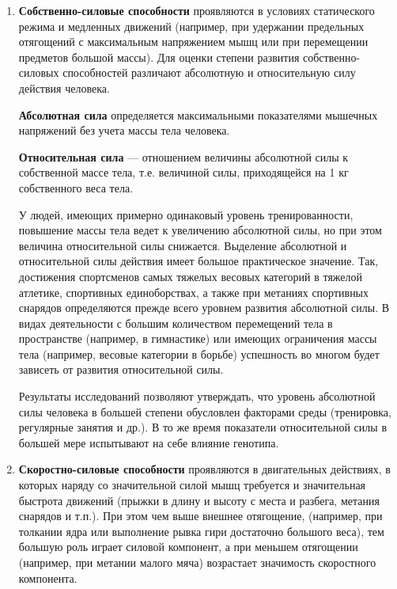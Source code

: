 \begin{enumerate}
    \item \textbf{Собственно-силовые способности} проявляются в условиях статического режима и медленных движений (например, при удержании
          предельных отягощений с максимальным напряжением мышц или при перемещении предметов большой массы).
          Для оценки степени развития собственно-силовых способностей различают абсолютную и относительную силу действия человека.

          \textbf{Абсолютная сила} определяется максимальными показателями мышечных напряжений без учета массы тела человека.

          \textbf{Относительная сила} --- отношением величины абсолютной силы к собственной массе тела, т.е. величиной силы, приходящейся на 1 кг
          собственного веса тела.

          У людей, имеющих примерно одинаковый уровень тренированности, повышение массы тела ведет к увеличению абсолютной силы, но
          при этом величина относительной силы снижается. Выделение абсолютной и относительной силы действия имеет большое практическое
          значение. Так, достижения спортсменов самых тяжелых весовых категорий в тяжелой атлетике, спортивных единоборствах,
          а также при метаниях спортивных снарядов определяются прежде всего уровнем развития абсолютной силы.
          В видах деятельности с большим количеством перемещений тела в пространстве (например, в гимнастике) или имеющих ограничения
          массы тела (например, весовые категории в борьбе) успешность во многом будет зависеть от развития относительной силы.

          Результаты исследований позволяют утверждать, что уровень абсолютной силы человека в большей степени обусловлен факторами
          среды (тренировка, регулярные занятия и др.). В то же время показатели относительной силы в большей мере испытывают на себе влияние генотипа.

    \item \textbf{Скоростно-силовые способности} проявляются в двигательных действиях, в которых наряду со значительной силой мышц требуется и
          значительная быстрота движений (прыжки в длину и высоту с места и разбега, метания снарядов и т.п.). При этом чем выше внешнее
          отягощение, (например, при толкании ядра или выполнение рывка гири достаточно большого веса), тем большую роль играет силовой компонент,
          а при меньшем отягощении (например, при метании малого мяча) возрастает значимость скоростного компонента.


\end{enumerate}
